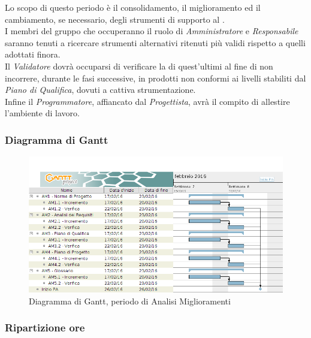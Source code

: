Lo scopo di questo periodo \`e il consolidamento, il miglioramento ed il cambiamento, se necessario, degli strumenti di supporto al .\\
I membri del gruppo che occuperanno il ruolo di \textit{Amministratore} e \textit{Responsabile} saranno tenuti a ricercare strumenti alternativi ritenuti pi\`u validi rispetto a quelli adottati finora.\\
Il \textit{Validatore} dovr\`a occuparsi di verificare la  di quest'ultimi al fine di non incorrere, durante le fasi successive, in prodotti non conformi ai livelli stabiliti dal \textit{Piano di Qualifica}, dovuti a cattiva strumentazione.\\
Infine il \textit{Programmatore}, affiancato dal \textit{Progettista}, avr\`a il compito di allestire l'ambiente di lavoro.

\subsubsection{Diagramma di Gantt}
\begin{figure}[ht!]
\includegraphics[width=1\textwidth]{res/img/pianificazione/AnalisiMiglioramenti.png}
\caption{Diagramma di Gantt, periodo di Analisi Miglioramenti}
\end{figure}


\subsubsection{Ripartizione ore}

